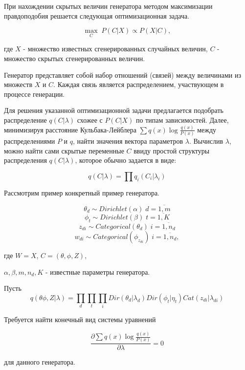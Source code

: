 \begin{problem}
При нахождении скрытых величин генератора методом максимизации правдоподобия решается следующая оптимизационная задача.

\[
\underset{C}{\max} \; P(C \vert X) \varpropto P(X \vert C),
\]

\noindent где $X$ - множество известных сгенерированных случайных величин, $C$ - множество скрытых  сгенерированных величин.

Генератор представляет собой набор отношений (связей) между величинами из множеств $X$ и $C$. 
Каждая связь является распределением, участвующем в процессе генерации. 

Для решения указанной оптимизационной задачи предлагается подобрать распределение $q(C \vert \lambda)$ схожее с $P(C \vert X)$ по типам зависимостей. Далее, минимизируя расстояние Кульбака-Лейблера $\sum q\left(x\right)\log \frac{q\left(x\right)}{P\left(x\right)}  $ между распределениями $P$ и $q$, найти значения вектора параметров $\lambda$. Вычислив $\lambda$, можно найти сами скрытые переменные $C$ ввиду простой структуры распределения $q(C \vert \lambda)$, которое обычно задается в виде:

\[
q(C \vert \lambda) = \prod q_i(C_i \vert \lambda_i) 
\]        

Рассмотрим пример конкретный пример генератора.

\[
\theta_d \sim Dirichlet(\alpha) \; d = \overline{1,m}
\]
\[
\phi_t \sim Dirichlet(\beta) \; t = \overline{1,K}
\]
\[
z_{di} \sim Categorical(\theta_d) \; i = \overline{1,n_d}
\]
\[
w_{di} \sim Categorical(\phi_{z_{di}}) \; i = \overline{1,n_d},
\]
 
где $W = X$, $C = (\theta, \phi, Z)$, 

$\alpha, \beta, m, n_d, K$ - известные параметры генератора.  

Пусть 
\[
q(\theta \phi, Z \vert \lambda) = \underset{d}{\prod}\underset{t}{\prod}\underset{i}{\prod} Dir(\theta_d | \lambda_{d}) Dir(\phi_t | \eta_{t}) Cat(z_{di} | \lambda_{di})
\]

Требуется найти конечный вид системы уравнений 

\[
\frac{\partial \sum q\left(x\right)\log \frac{q\left(x\right)}{P\left(x\right)} } {\partial \lambda} = 0
\]  

для данного генератора.

\end{problem}

